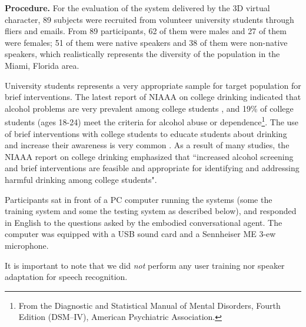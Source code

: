 \documentclass[letterpaper]{article}
\begin{document}
{\bf Procedure.}  For the evaluation of the system delivered by the 3D virtual character, 89 subjects were recruited from volunteer university students through fliers and emails.  From 89 participants, 62 of them were males and 27 of them were females; 51 of them were native speakers and 38 of them were non-native speakers,   which realistically represents the diversity of the population in the Miami, Florida area.

University students represents a very appropriate sample for target population for brief interventions. The latest report of NIAAA on college drinking indicated that alcohol problems are very prevalent among college students \cite{NIAAA2007colleges}, and 19\% of college students (ages 18-24) meet the criteria for alcohol abuse or dependence\footnote{From the Diagnostic and Statistical Manual of Mental Disorders, Fourth Edition (DSM–IV), American Psychiatric Association.}. The use of brief interventions with college students to educate students about drinking and  increase their awareness is very common \cite{NIAAA2007colleges}. As a result of many studies, the NIAAA report on college drinking emphasized that ``increased alcohol screening and brief interventions are feasible  and appropriate for identifying and addressing harmful drinking among college students". 

Participants sat in front of a PC computer running the systems (some the training system and some the testing system as described below), and responded in English to the questions asked by the embodied conversational agent.  The computer was equipped with a USB sound card and a Sennheiser ME 3-ew microphone.

It is important to note that we did {\em not} perform any user training nor speaker adaptation for speech recognition. 
\end{document}
